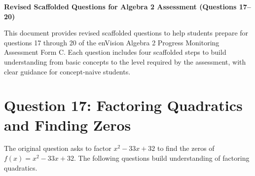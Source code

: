 \documentclass[12pt]{article}
\begin{document}
\begin{center}
    \textbf{Revised Scaffolded Questions for Algebra 2 Assessment (Questions 17--20)}
\end{center}

This document provides revised scaffolded questions to help students prepare for questions 17 through 20 of the enVision Algebra 2 Progress Monitoring Assessment Form C. Each question includes four scaffolded steps to build understanding from basic concepts to the level required by the assessment, with clear guidance for concept-naive students.

\section*{Question 17: Factoring Quadratics and Finding Zeros}
The original question asks to factor \( x^2 - 33x + 32 \) to find the zeros of \( f(x) = x^2 - 33x + 32 \). The following questions build understanding of factoring quadratics.
\end{document}
